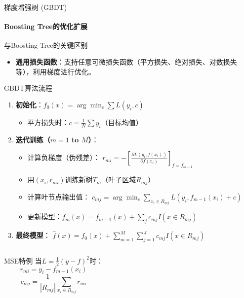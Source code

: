 \documentclass{ctexbeamer}
\begin{document}
\begin{frame}{梯度增强树 (GBDT)}
\framesubtitle{Boosting Tree的优化扩展}

\begin{block}{与Boosting Tree的关键区别}
\begin{itemize}
\item \textbf{通用损失函数}：支持任意可微损失函数（平方损失、绝对损失、对数损失等），利用梯度进行优化。
\end{itemize}
\end{block}

\begin{block}{GBDT算法流程}
\begin{enumerate}
\item \textbf{初始化}：$f_0(x) = \arg \min_c \sum L(y_i, c)$
\begin{itemize}
\small
\item 平方损失时：$c = \frac{1}{N}\sum y_i$（目标均值）
\end{itemize}

\item \textbf{迭代训练（$m=1$ to $M$）}：
\begin{itemize}
\item 计算负梯度（伪残差）：
$ r_{mi} = -\left[\frac{\partial L(y_i, f(x_i))}{\partial f(x_i)}\right]_{f=f_{m-1}} $
\item 用$(x_i, r_{mi})$训练新树$T_m$（叶子区域$R_{mj}$）
\item 计算叶节点输出值：
$ c_{mj} = \arg \min_c \sum_{x_i \in R_{mj}} L(y_i, f_{m-1}(x_i) + c) $
\item 更新模型：$f_m(x) = f_{m-1}(x) + \sum_j c_{mj} I(x \in R_{mj}) $
\end{itemize}

\item \textbf{最终模型}：
$ \hat{f}(x) = f_0(x) + \sum_{m=1}^M \sum_{j=1}^J c_{mj} I(x \in R_{mj}) $
\end{enumerate}
\end{block}

\begin{columns}[T]
\begin{exampleblock}{MSE特例}
当$L = \frac{1}{2}(y-f)^2$时：
\[
r_{mi} = y_i - f_{m-1}(x_i)
\]
\[
c_{mj} = \frac{1}{|R_{mj}|}\sum_{x_i \in R_{mj}} r_{mi}
\]
\end{exampleblock}

\end{columns}
\end{frame}
\end{document}

